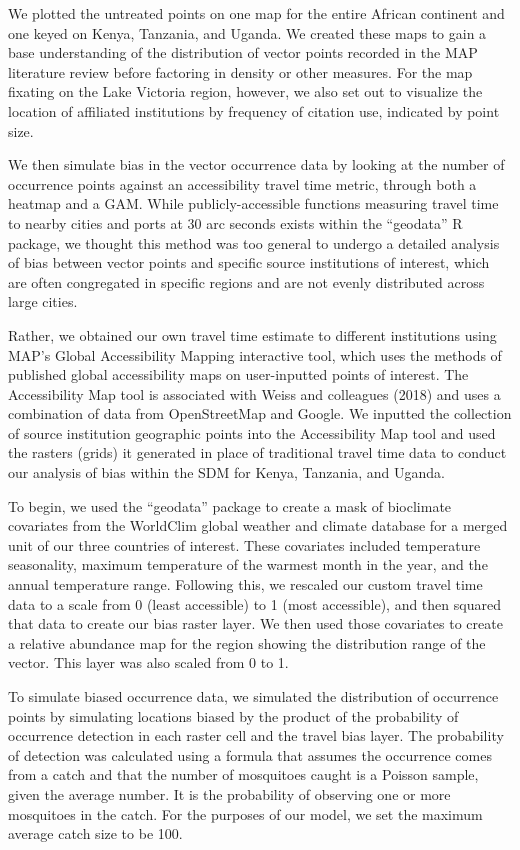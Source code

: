 \documentclass[sn-nature]{sn-jnl}%
\begin{document}
{We plotted the untreated points on one map for the entire African continent and one keyed on Kenya, Tanzania, and Uganda. We created these maps to gain a base understanding of the distribution of vector points recorded in the MAP literature review before factoring in density or other measures. For the map fixating on the Lake Victoria region, however, we also set out to visualize the location of affiliated institutions by frequency of citation use, indicated by point size.

We then simulate bias in the vector occurrence data by looking at the number of occurrence points against an accessibility travel time metric, through both a heatmap and a GAM. While publicly-accessible functions measuring travel time to nearby cities and ports at 30 arc seconds exists within the “geodata” R package, we thought this method was too general to undergo a detailed analysis of bias between vector points and specific source institutions of interest, which are often congregated in specific regions and are not evenly distributed across large cities. 

Rather, we obtained our own travel time estimate to different institutions using MAP’s Global Accessibility Mapping interactive tool, which uses the methods of published global accessibility maps on user-inputted points of interest. The Accessibility Map tool is associated with Weiss and colleagues (2018) and uses a combination of data from OpenStreetMap and Google. We inputted the collection of source institution geographic points into the Accessibility Map tool and used the rasters (grids) it generated in place of traditional travel time data to conduct our analysis of bias within the SDM for Kenya, Tanzania, and Uganda.

To begin, we used the “geodata” package to create a mask of bioclimate covariates from the WorldClim global weather and climate database for a merged unit of our three countries of interest. These covariates included temperature seasonality, maximum temperature of the warmest month in the year, and the annual temperature range. Following this, we rescaled our custom travel time data to a scale from 0 (least accessible) to 1 (most accessible), and then squared that data to create our bias raster layer. We then used those covariates to create a relative abundance map for the region showing the distribution range of the vector. This layer was also scaled from 0 to 1. 

To simulate biased occurrence data, we simulated the distribution of occurrence points by
simulating locations biased by the product of the probability of occurrence detection in each raster cell and the travel bias layer. The probability of detection was calculated using a formula that assumes the occurrence comes from a catch and that the number of mosquitoes caught is a Poisson sample, given the average number. It is the probability of observing one or more mosquitoes in the catch. For the purposes of our model, we set the maximum average catch size to be 100. 

}
\end{document}
